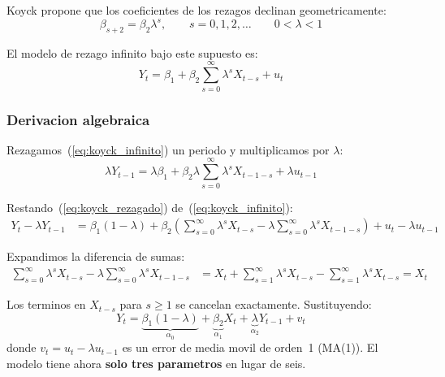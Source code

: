 \documentclass[12pt, letterpaper]{article}
\theoremstyle{remark}
\begin{document}
Koyck propone que los coeficientes de los rezagos declinan geometricamente:
\begin{equation}
  \beta_{s+2} = \beta_2 \lambda^s, \qquad s = 0, 1, 2, \ldots
  \qquad 0 < \lambda < 1
  \label{eq:koyck_supuesto}
\end{equation}

El modelo de rezago infinito bajo este supuesto es:
\begin{equation}
  Y_t = \beta_1 + \beta_2 \sum_{s=0}^{\infty} \lambda^s X_{t-s} + u_t
  \label{eq:koyck_infinito}
\end{equation}

\subsubsection{Derivacion algebraica}

Rezagamos~(\ref{eq:koyck_infinito}) un periodo y multiplicamos por $\lambda$:
\begin{equation}
  \lambda Y_{t-1} = \lambda\beta_1 + \beta_2\lambda \sum_{s=0}^{\infty}\lambda^s X_{t-1-s} + \lambda u_{t-1}
  \label{eq:koyck_rezagado}
\end{equation}

Restando~(\ref{eq:koyck_rezagado}) de~(\ref{eq:koyck_infinito}):
\begin{align}
  Y_t - \lambda Y_{t-1}
  &= \beta_1(1-\lambda)
     + \beta_2\left(\sum_{s=0}^{\infty}\lambda^s X_{t-s}
     - \lambda\sum_{s=0}^{\infty}\lambda^s X_{t-1-s}\right)
     + u_t - \lambda u_{t-1}
  \label{eq:koyck_resta1}
\end{align}

Expandimos la diferencia de sumas:
\begin{align}
  \sum_{s=0}^{\infty}\lambda^s X_{t-s}
  - \lambda\sum_{s=0}^{\infty}\lambda^s X_{t-1-s}
  &= X_t + \sum_{s=1}^{\infty}\lambda^s X_{t-s}
   - \sum_{s=1}^{\infty}\lambda^s X_{t-s} = X_t
  \label{eq:cancelacion}
\end{align}

Los terminos en $X_{t-s}$ para $s \geq 1$ se cancelan exactamente. Sustituyendo:
\begin{equation}
  \boxed{
    Y_t = \underbrace{\beta_1(1-\lambda)}_{\alpha_0}
          + \underbrace{\beta_2}_{\alpha_1} X_t
          + \underbrace{\lambda}_{\alpha_2} Y_{t-1}
          + v_t
  }
  \label{eq:koyck_final}
\end{equation}
donde $v_t = u_t - \lambda u_{t-1}$ es un error de media movil de orden~1
(MA(1)). El modelo tiene ahora \textbf{solo tres parametros} en lugar de seis.
\end{document}
